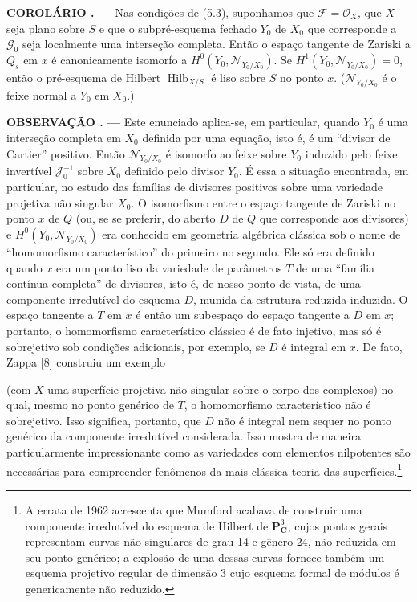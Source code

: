 \documentclass[11pt,twoside,openany]{book}
\numberwithin{equation}{section}
\newcommand{\src}[1]{%
  \phantomsection\hypertarget{src:#1}{}%
  \marginpar{\raggedleft\footnotesize\sffamily #1}%
}
\theoremstyle{plain}
\theoremstyle{definition}
\theoremstyle{remark}
\newcommand{\result}[2]{%
  \par\medskip\noindent\textbf{#1%
  \if\relax\detokenize{#2}\relax\else\space#2\fi. ---}\enspace
}
\newcommand{\FgaUnitKey}{frontmatter}
\renewcommand{\src}[1]{%
  \phantomsection\hypertarget{src:\FgaUnitKey:#1}{}%
  \marginpar{\raggedleft\footnotesize\sffamily #1}%
}
\begin{document}
\result{COROLÁRIO}{5.4} Nas condições de (5.3), suponhamos que
$\mathcal F=\mathcal O_X$, que $X$ seja plano sobre $S$ e que o
subpré-esquema fechado $Y_0$ de $X_0$ que corresponde a $\mathcal G_0$ seja
localmente uma interseção completa. Então o espaço tangente de Zariski a $Q_s$
em $x$ é canonicamente isomorfo a
$H^0(Y_0,\mathcal N_{Y_0/X_0})$. Se
$H^1(Y_0,\mathcal N_{Y_0/X_0})=0$, então o pré-esquema de Hilbert
$\operatorname{Hilb}_{X/S}$ é liso sobre $S$ no ponto $x$.
($\mathcal N_{Y_0/X_0}$ é o feixe normal a $Y_0$ em $X_0$.)

\result{OBSERVAÇÃO}{5.5} Este enunciado aplica-se, em particular, quando $Y_0$
é uma interseção completa em $X_0$ definida por uma equação, isto é, é um
``divisor de Cartier'' positivo. Então $\mathcal N_{Y_0/X_0}$ é isomorfo ao
feixe sobre $Y_0$ induzido pelo feixe invertível $\mathcal J_0^{-1}$ sobre $X_0$
definido pelo divisor $Y_0$. É essa a situação encontrada, em particular, no
estudo das famílias de divisores positivos sobre uma variedade projetiva não
singular $X_0$. O isomorfismo entre o espaço tangente de Zariski no ponto $x$
de $Q$ (ou, se se preferir, do aberto $D$ de $Q$ que corresponde aos divisores)
e $H^0(Y_0,\mathcal N_{Y_0/X_0})$ era conhecido em geometria algébrica
clássica sob o nome de ``homomorfismo característico'' do primeiro no segundo.
Ele só era definido quando $x$ era um ponto liso da variedade de parâmetros
$T$ de uma ``família contínua completa'' de divisores, isto é, de nosso ponto
de vista, de uma componente irredutível do esquema $D$, munida da estrutura
reduzida induzida. O espaço tangente a $T$ em $x$ é então um subespaço do
espaço tangente a $D$ em $x$; portanto, o homomorfismo característico clássico
é de fato injetivo, mas só é sobrejetivo sob condições adicionais, por exemplo,
se $D$ é integral em $x$. De fato, Zappa [8] construiu um exemplo
\src{272}
(com $X$ uma superfície projetiva não singular sobre o corpo dos complexos) no
qual, mesmo no ponto genérico de $T$, o homomorfismo característico não é
sobrejetivo. Isso significa, portanto, que $D$ não é integral nem sequer no
ponto genérico da componente irredutível considerada. Isso mostra de maneira
particularmente impressionante como as variedades com elementos nilpotentes
são necessárias para compreender fenômenos da mais clássica teoria das
superfícies.\footnote{A errata de 1962 acrescenta que Mumford acabava de
construir uma componente irredutível do esquema de Hilbert de
$\mathbf P^3_{\mathbf C}$, cujos pontos gerais representam curvas não
singulares de grau 14 e gênero 24, não reduzida em seu ponto genérico; a
explosão de uma dessas curvas fornece também um esquema projetivo regular de
dimensão 3 cujo esquema formal de módulos é genericamente não reduzido.}
\end{document}
